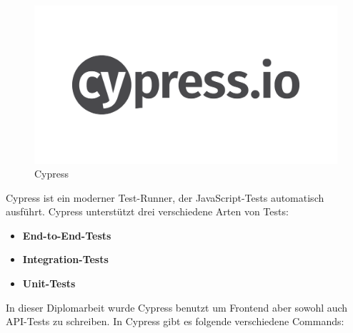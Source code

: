 \begin{figure}[h]
    \centering
    \includegraphics[width=0.3\linewidth]{pics/cypress-logo.png}
    \caption{Cypress}
    \label{fig:enter-label}
\end{figure}


Cypress ist ein moderner Test-Runner, der JavaScript-Tests automatisch ausführt.
Cypress unterstützt drei verschiedene Arten von Tests:

\begin{itemize}
\item \textbf{End-to-End-Tests}
\item \textbf{Integration-Tests}
\item \textbf{Unit-Tests}
\end{itemize}

In dieser Diplomarbeit wurde Cypress benutzt um Frontend aber sowohl auch API-Tests zu schreiben.
In Cypress gibt es folgende verschiedene Commands:

